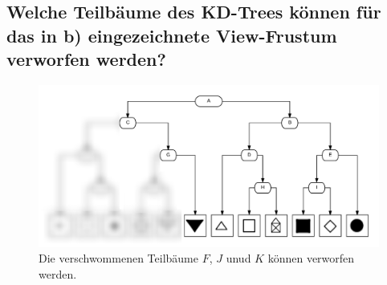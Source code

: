 \documentclass[a4paper,10pt,DIV=14]{article}
\begin{document}
\newpage
\subsection{Welche Teilbäume des KD-Trees können für das in b) eingezeichnete View-Frustum verworfen werden?}

\begin{figure}[!htbp]
	\centering
	\includegraphics[width=1\linewidth]{kd_blur}
	\caption*{Die verschwommenen Teilbäume $F$, $J$ unud $K$ können verworfen werden.}
\end{figure}
\end{document}
